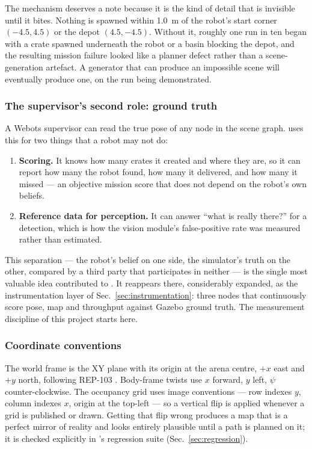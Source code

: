 The  mechanism deserves a note because it is the kind
of detail that is invisible until it bites. Nothing is spawned within
\SI{1.0}{m} of the robot's start corner $(-4.5, 4.5)$ or the depot
$(4.5, -4.5)$. Without it, roughly one run in ten began with a crate
spawned underneath the robot or a basin blocking the depot, and the
resulting mission failure looked like a planner defect rather than a
scene-generation artefact. A generator that can produce an impossible
scene will eventually produce one, on the run being demonstrated.

\subsubsection{The supervisor's second role: ground truth}

A Webots supervisor can read the true pose of any node in the scene
graph.  uses this for two things that a
robot may not do:

\begin{enumerate}[leftmargin=*,itemsep=1pt,topsep=2pt]
  \item \textbf{Scoring.} It knows how many crates it created and where
        they are, so it can report how many the robot found, how many it
        delivered, and how many it missed --- an objective mission score
        that does not depend on the robot's own beliefs.
  \item \textbf{Reference data for perception.} It can answer
        ``what is really there?'' for a detection, which is how the
        vision module's false-positive rate was measured rather than
        estimated.
\end{enumerate}

This separation --- the robot's belief on one side, the simulator's
truth on the other, compared by a third party that participates in
neither --- is the single most valuable idea \phaseA{} contributed to
\phaseB{}. It reappears there, considerably expanded, as the
instrumentation layer of Sec.~\ref{sec:instrumentation}: three nodes
that continuously score pose, map and throughput against Gazebo ground
truth. The measurement discipline of this project starts here.

\subsubsection{Coordinate conventions}

The world frame is the XY plane with its origin at the arena centre,
$+x$ east and $+y$ north, following REP-103 \cite{rep103}. Body-frame
twists use $x$ forward, $y$ left, $\psi$ counter-clockwise. The
occupancy grid uses image conventions --- row indexes $y$, column
indexes $x$, origin at the top-left --- so a vertical flip is applied
whenever a grid is published or drawn. Getting that flip wrong produces
a map that is a perfect mirror of reality and looks entirely plausible
until a path is planned on it; it is checked explicitly in
\phaseB{}'s regression suite (Sec.~\ref{sec:regression}).
